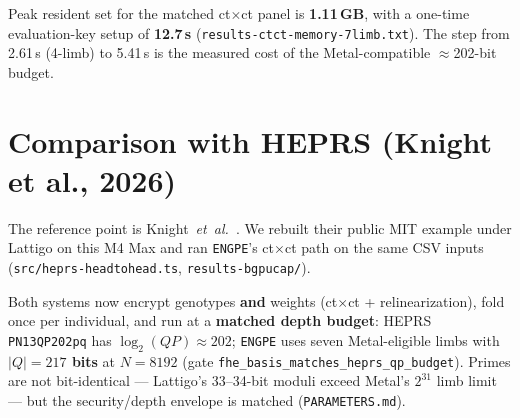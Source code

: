 \documentclass[11pt,a4paper]{article}
\newcommand{\engpe}{\texttt{ENGPE}}
\DeclareRobustCommand{\code}[1]{\texttt{#1}}
\DeclareRobustCommand{\file}[1]{\texttt{#1}}
\newcommand{\longcode}[1]{{\urlstyle{tt}\nolinkurl{#1}}}
\begin{document}
Peak resident set for the matched ct$\times$ct panel is \textbf{1.11\,GB}, with a
one-time evaluation-key setup of \textbf{12.7\,s}
(\file{results-ctct-memory-7limb.txt}). The step from 2.61\,s (4-limb) to 5.41\,s
is the measured cost of the Metal-compatible $\approx$202-bit budget.

\section{Comparison with HEPRS (Knight et al., 2026)}
\label{sec:heprs}

The reference point is Knight~\textit{et~al.}~\cite{knight2026heprs}. We rebuilt
their public MIT example under Lattigo on this M4 Max and ran \engpe{}'s
ct$\times$ct path on the same CSV inputs (\file{src/heprs-headtohead.ts},
\file{results-bgpucap/}).

Both systems now encrypt genotypes \textbf{and} weights (ct$\times$ct +
relinearization), fold once per individual, and run at a \textbf{matched depth
budget}: HEPRS \code{PN13QP202pq} has $\log_2(QP)\approx 202$; \engpe{} uses seven
Metal-eligible limbs with \textbf{$|Q| = 217$ bits} at $N = 8192$ (gate
\longcode{fhe_basis_matches_heprs_qp_budget}). Primes are not bit-identical ---
Lattigo's 33--34-bit moduli exceed Metal's $2^{31}$ limb limit --- but the
security/depth envelope is matched (\file{PARAMETERS.md}).
\end{document}
